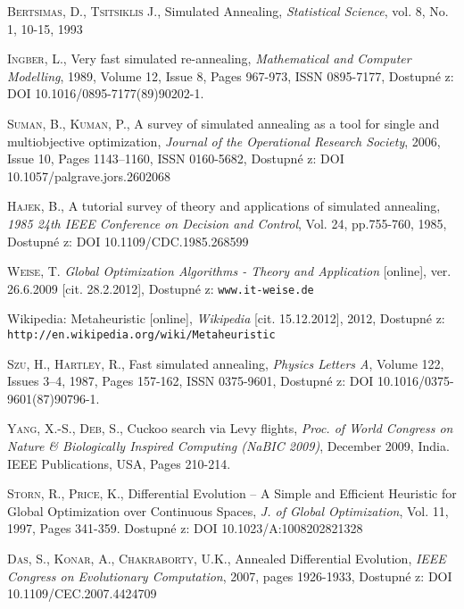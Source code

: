 \begin{thebibliography}{99}
        \textsc{Bertsimas}, D., \textsc{Tsitsiklis} J., Simulated Annealing,
        \textit{Statistical Science}, vol. 8, No. 1, 10-15, 1993

        \textsc{Ingber}, L., Very fast simulated re-annealing, \textit{Mathematical and Computer Modelling}, 1989, Volume 12, Issue 8, Pages 967-973, ISSN 0895-7177, Dostupné z: DOI 10.1016/0895-7177(89)90202-1.

        \textsc{Suman}, B., \textsc{Kuman}, P., A survey of simulated annealing as a tool for single and multiobjective optimization, \textit{Journal of the Operational Research Society}, 2006, Issue 10, Pages 1143–1160, ISSN 0160-5682, Dostupné z: DOI 10.1057/palgrave.jors.2602068

        \textsc{Hajek}, B., A tutorial survey of theory and applications of simulated annealing, \textit{1985 24th IEEE Conference on Decision and Control}, Vol. 24, pp.755-760, 1985, Dostupné z: DOI 10.1109/CDC.1985.268599

        \textsc{Weise}, T. \textit{Global Optimization Algorithms - Theory and Application} [online], ver. 26.6.2009 [cit. 28.2.2012], Dostupné z: \texttt{www.it-weise.de}

        Wikipedia: Metaheuristic [online], \textit{Wikipedia} [cit. 15.12.2012], 2012, Dostupné z: \texttt{http://en.wikipedia.org/wiki/Metaheuristic}

        \textsc{Szu}, H., \textsc{Hartley}, R., Fast simulated annealing, \textit{Physics Letters A}, Volume 122, Issues 3–4, 1987, Pages 157-162, ISSN 0375-9601, Dostupné z: DOI 10.1016/0375-9601(87)90796-1.

        \textsc{Yang}, X.-S., \textsc{Deb}, S., Cuckoo search via Levy flights, \textit{Proc. of World Congress on Nature \& Biologically Inspired Computing (NaBIC 2009)}, December 2009, India. IEEE Publications, USA, Pages 210-214.

        \textsc{Storn}, R., \textsc{Price}, K., Differential Evolution – A Simple and Efficient Heuristic for Global Optimization over Continuous Spaces, \textit{J. of Global Optimization}, Vol. 11, 1997, Pages 341-359. Dostupné z: DOI 10.1023/A:1008202821328

        \textsc{Das}, S., \textsc{Konar}, A., \textsc{Chakraborty}, U.K., Annealed Differential Evolution, \textit{IEEE Congress on Evolutionary Computation}, 2007, pages 1926-1933, Dostupné z: DOI 10.1109/CEC.2007.4424709


\end{thebibliography}
